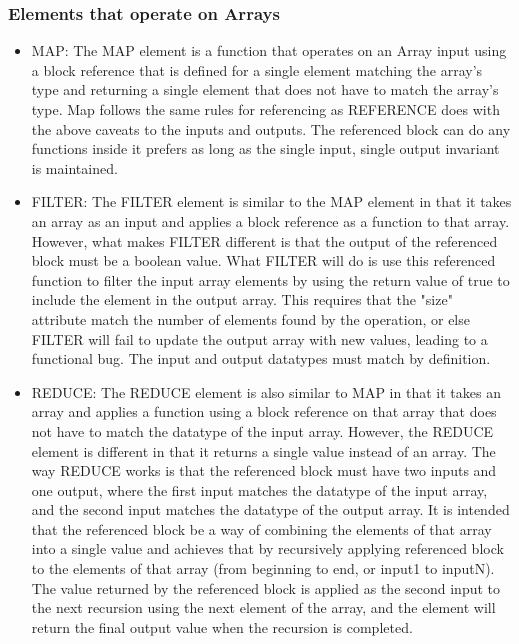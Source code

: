 \subsubsection{Elements that operate on Arrays}
\begin{itemize}[label={}]
    \item MAP:
The MAP element is a function that operates on an Array input using a block reference that is defined for a single element matching the array's type and returning a single element that does not have to match the array's type.
Map follows the same rules for referencing as REFERENCE does with the above caveats to the inputs and outputs.
The referenced block can do any functions inside it prefers as long as the single input, single output invariant is maintained.
    \item FILTER:
The FILTER element is similar to the MAP element in that it takes an array as an input and applies a block reference as a function to that array.
However, what makes FILTER different is that the output of the referenced block must be a boolean value.
What FILTER will do is use this referenced function to filter the input array elements by using the return value of true to include the element in the output array.
This requires that the "size" attribute match the number of elements found by the operation, or else FILTER will fail to update the output array with new values, leading to a functional bug.
The input and output datatypes must match by definition.
    \item REDUCE:
The REDUCE element is also similar to MAP in that it takes an array and applies a function using a block reference on that array that does not have to match the datatype of the input array.
However, the REDUCE element is different in that it returns a single value instead of an array.
The way REDUCE works is that the referenced block must have two inputs and one output, where the first input matches the datatype of the input array, and the second input matches the datatype of the output array.
It is intended that the referenced block be a way of combining the elements of that array into a single value and achieves that by recursively applying referenced block to the elements of that array (from beginning to end, or input1 to inputN).
The value returned by the referenced block is applied as the second input to the next recursion using the next element of the array, and the element will return the final output value when the recursion is completed.
\end{itemize}
